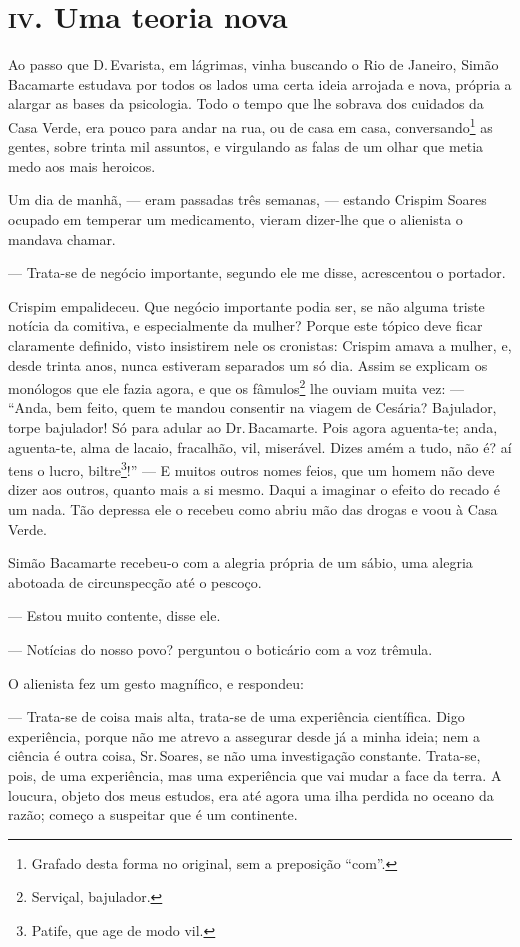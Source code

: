 \section*{\textsc{iv}. Uma teoria nova }

Ao passo que D.\,Evarista, em lágrimas, vinha buscando o Rio de Janeiro,
Simão Bacamarte estudava por todos os lados uma certa ideia arrojada e
nova, própria a alargar as bases da psicologia. Todo o tempo que lhe
sobrava dos cuidados da Casa Verde, era pouco para andar na rua, ou de
casa em casa, conversando\footnote{Grafado desta forma no original, sem
  a preposição ``com''.} as gentes, sobre trinta mil assuntos, e
virgulando as falas de um olhar que metia medo aos mais heroicos.

Um dia de manhã, --- eram passadas três semanas, --- estando Crispim
Soares ocupado em temperar um medicamento, vieram dizer-lhe que o
alienista o mandava chamar.

--- Trata-se de negócio importante, segundo ele me disse, acrescentou o
portador.

Crispim empalideceu. Que negócio importante podia ser, se não alguma
triste notícia da comitiva, e especialmente da mulher? Porque este
tópico deve ficar claramente definido, visto insistirem nele os
cronistas: Crispim amava a mulher, e, desde trinta anos, nunca estiveram
separados um só dia. Assim se explicam os monólogos que ele fazia agora,
e que os fâmulos\footnote{Serviçal, bajulador.} lhe ouviam muita vez:
--- ``Anda, bem feito, quem te mandou consentir na viagem de Cesária?
Bajulador, torpe bajulador! Só para adular ao Dr.\,Bacamarte. Pois agora
aguenta-te; anda, aguenta-te, alma de lacaio, fracalhão, vil, miserável.
Dizes amém a tudo, não é? aí tens o lucro, biltre\footnote{Patife, que
  age de modo vil.}!'' --- E muitos outros nomes feios, que um homem não
deve dizer aos outros, quanto mais a si mesmo. Daqui a imaginar o efeito
do recado é um nada. Tão depressa ele o recebeu como abriu mão das
drogas e voou à Casa Verde.

Simão Bacamarte recebeu-o com a alegria própria de um sábio, uma alegria
abotoada de circunspecção até o pescoço.

--- Estou muito contente, disse ele.

--- Notícias do nosso povo? perguntou o boticário com a voz trêmula.

O alienista fez um gesto magnífico, e respondeu:

--- Trata-se de coisa mais alta, trata-se de uma experiência científica.
Digo experiência, porque não me atrevo a assegurar desde já a minha
ideia; nem a ciência é outra coisa, Sr.\,Soares, se não uma investigação
constante. Trata-se, pois, de uma experiência, mas uma experiência que
vai mudar a face da terra. A loucura, objeto dos meus estudos, era até
agora uma ilha perdida no oceano da razão; começo a suspeitar que é um
continente.

